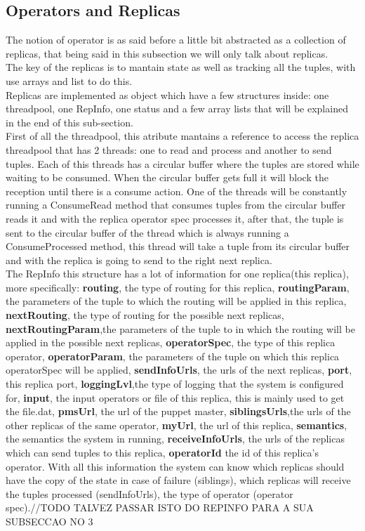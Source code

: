 \documentclass[times, 10pt, twocolumn]{article}
\begin{document}
\subsection{Operators and Replicas}
The notion of operator is as said before a little bit abstracted as a collection of replicas, that being said in this subsection we will only talk about replicas. 
\\The key of the replicas is to mantain state as well as tracking all the tuples, with use arrays and list to do this.
\\Replicas are implemented as object which have a few structures inside: one threadpool, one RepInfo, one status and a few array lists that will be explained in the end of this sub-section.
\\First of all the threadpool, this atribute mantains a reference to access the replica threadpool that has 2 threads: one to read and process and another to send tuples. Each of this threads has a circular buffer where the tuples are stored while waiting to be consumed. When the circular buffer gets full it will block the reception until there is a consume action. One of the threads will be constantly running a ConsumeRead method that consumes tuples from the circular buffer reads it and with the replica operator spec processes it, after that, the tuple is sent to the circular buffer of the thread which is always running a ConsumeProcessed method, this thread will take a tuple from its circular buffer and with the replica is going to send to the right next replica.
\\The RepInfo this structure has a lot of information for one replica(this replica), more specifically: \textbf{routing}, the type of routing for this replica, \textbf{routingParam}, the parameters of the tuple to which the routing will be applied in this replica, \textbf{nextRouting}, the type of routing for the possible next replicas, \textbf{nextRoutingParam},the parameters of the tuple to in which the routing will be applied in the possible next replicas, \textbf{operatorSpec}, the type of this replica operator, \textbf{operatorParam}, the parameters of the tuple on which this replica operatorSpec will be applied, \textbf{sendInfoUrls}, the urls of the next replicas, \textbf{port}, this replica port, \textbf{loggingLvl},the type of logging that the system is configured for, \textbf{input}, the input operators or file of this replica, this is mainly used to get the file.dat, \textbf{pmsUrl}, the url of the puppet master, \textbf{siblingsUrls},the urls of the other replicas of the same operator,  \textbf{myUrl}, the url of this replica,   \textbf{semantics}, the semantics the system in running,  \textbf{receiveInfoUrls}, the urls of the replicas which can send tuples to this replica, \textbf{operatorId} the id of this replica's operator. With all this information the system can know which replicas should have the copy of the state in case of failure (siblings), which replicas will receive the tuples processed (sendInfoUrls), the type of operator (operator spec).//TODO TALVEZ PASSAR ISTO DO REPINFO PARA A SUA SUBSECCAO NO 3
\end{document}
